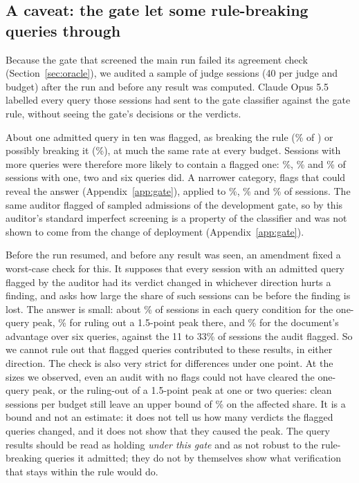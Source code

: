 \subsection{A caveat: the gate let some rule-breaking queries through}
\label{sec:gate}

Because the gate that screened the main run failed its agreement check (Section~\ref{sec:oracle}), we audited a
sample of \nAuditSessions{} judge sessions (40 per judge and budget) after the run and before any result was
computed. Claude Opus 5.5 labelled every query those sessions had sent to the gate classifier against the gate rule,
without seeing the gate's decisions or the verdicts.

About one admitted query in ten was flagged, as breaking the rule (\auditViolShare\% of \nAuditAdmitted) or possibly
breaking it (\auditBordShare\%), at much the same rate
at every budget. Sessions with more queries were therefore more likely to contain a flagged one: \exposedOne\%,
\exposedTwo\% and \exposedSix\% of sessions with one, two and six queries did. A narrower category, flags that could
reveal the answer (Appendix~\ref{app:gate}), applied to \leakOne\%, \leakTwo\% and \leakSix\% of sessions. The same
auditor flagged
\pilotAdmFlaggedShare{} of \pilotAdmSampled{} sampled admissions of the development gate, so by this auditor's
standard imperfect screening is a property of the classifier and was not shown to come from the change of deployment
(Appendix~\ref{app:gate}).

Before the run resumed, and before any result was seen, an amendment fixed a worst-case check for this. It supposes
that every session with an admitted query flagged by the auditor had its verdict changed in whichever direction
hurts a finding, and asks how
large the share of such sessions can be before the finding is lost. The answer is small: about \tipPeak\% of
sessions in each query condition for the one-query peak, \tipRuledOutOne\% for ruling out a 1.5-point peak there,
and \tipWorldSix\% for the document's advantage over six queries, against the 11 to 33\% of sessions the audit
flagged. So we cannot rule out that flagged queries contributed to these results, in either direction. The check is
also very strict for differences under one point. At the sizes we observed, even an audit with no flags could not
have cleared the one-query peak, or the ruling-out of a 1.5-point peak at one or two queries: \nAuditPerBudget{} clean
sessions per budget still leave an upper bound of \auditZeroFlagBound\% on the affected share. It is a bound and not
an estimate: it does not tell us how many verdicts the flagged queries changed, and it does not show that they
caused the peak. The query results should be read as holding \emph{under this gate} and as not robust to the
rule-breaking queries it admitted; they do not by themselves show what verification that stays within the rule would
do.

